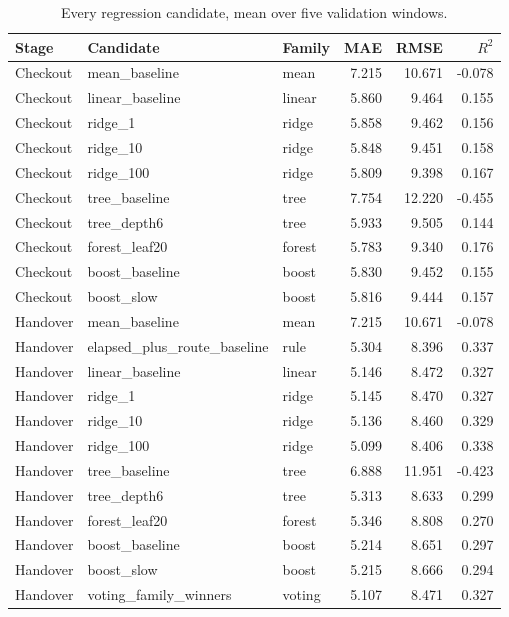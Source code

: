 \begin{table}[H]
\centering\small
\caption{Every regression candidate, mean over five validation windows.}
\label{tab:app-regression}
\begin{tabular}{@{}lllrrr@{}}
\toprule
Stage & Candidate & Family & MAE & RMSE & $R^2$ \\
\midrule
Checkout & mean\_baseline & mean & 7.215 & 10.671 & -0.078 \\
Checkout & linear\_baseline & linear & 5.860 & 9.464 & 0.155 \\
Checkout & ridge\_1 & ridge & 5.858 & 9.462 & 0.156 \\
Checkout & ridge\_10 & ridge & 5.848 & 9.451 & 0.158 \\
Checkout & ridge\_100 & ridge & 5.809 & 9.398 & 0.167 \\
Checkout & tree\_baseline & tree & 7.754 & 12.220 & -0.455 \\
Checkout & tree\_depth6 & tree & 5.933 & 9.505 & 0.144 \\
Checkout & forest\_leaf20 & forest & 5.783 & 9.340 & 0.176 \\
Checkout & boost\_baseline & boost & 5.830 & 9.452 & 0.155 \\
Checkout & boost\_slow & boost & 5.816 & 9.444 & 0.157 \\
Handover & mean\_baseline & mean & 7.215 & 10.671 & -0.078 \\
Handover & elapsed\_plus\_route\_baseline & rule & 5.304 & 8.396 & 0.337 \\
Handover & linear\_baseline & linear & 5.146 & 8.472 & 0.327 \\
Handover & ridge\_1 & ridge & 5.145 & 8.470 & 0.327 \\
Handover & ridge\_10 & ridge & 5.136 & 8.460 & 0.329 \\
Handover & ridge\_100 & ridge & 5.099 & 8.406 & 0.338 \\
Handover & tree\_baseline & tree & 6.888 & 11.951 & -0.423 \\
Handover & tree\_depth6 & tree & 5.313 & 8.633 & 0.299 \\
Handover & forest\_leaf20 & forest & 5.346 & 8.808 & 0.270 \\
Handover & boost\_baseline & boost & 5.214 & 8.651 & 0.297 \\
Handover & boost\_slow & boost & 5.215 & 8.666 & 0.294 \\
Handover & voting\_family\_winners & voting & 5.107 & 8.471 & 0.327 \\
\bottomrule
\end{tabular}
\end{table}